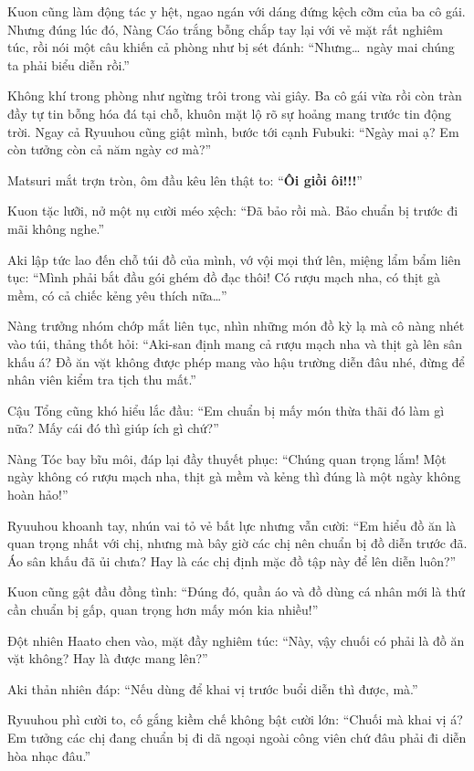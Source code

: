 \documentclass[../main.tex]{subfiles}
\begin{document}
Kuon cũng làm động tác y hệt, ngao ngán với dáng đứng kệch cỡm của ba cô gái. Nhưng đúng lúc đó, Nàng Cáo trắng bỗng chắp tay lại với vẻ mặt rất nghiêm túc, rồi nói một câu khiến cả phòng như bị sét đánh: ``Nhưng\dots\ ngày mai chúng ta phải biểu diễn rồi.''

Không khí trong phòng như ngừng trôi trong vài giây. Ba cô gái vừa rồi còn tràn đầy tự tin bỗng hóa đá tại chỗ, khuôn mặt lộ rõ sự hoảng mang trước tin động trời. Ngay cả Ryuuhou cũng giật mình, bước tới cạnh Fubuki: ``Ngày mai ạ? Em còn tưởng còn cả năm ngày cơ mà?''


Matsuri mắt trợn tròn, ôm đầu kêu lên thật to: ``\textbf{Ôi giồi ôi!!!}''

Kuon tặc lưỡi, nở một nụ cười méo xệch: ``Đã bảo rồi mà. Bảo chuẩn bị trước đi mãi không nghe.''

Aki lập tức lao đến chỗ túi đồ của mình, vớ vội mọi thứ lên, miệng lẩm bẩm liên tục: ``Mình phải bắt đầu gói ghém đồ đạc thôi! Có rượu mạch nha, có thịt gà mềm, có cả chiếc kẻng yêu thích nữa\dots''

Nàng trưởng nhóm chớp mắt liên tục, nhìn những món đồ kỳ lạ mà cô nàng nhét vào túi, thảng thốt hỏi: ``Aki-san định mang cả rượu mạch nha và thịt gà lên sân khấu á? Đồ ăn vặt không được phép mang vào hậu trường diễn đâu nhé, đừng để nhân viên kiểm tra tịch thu mất.''

Cậu Tổng cũng khó hiểu lắc đầu: ``Em chuẩn bị mấy món thừa thãi đó làm gì nữa? Mấy cái đó thì giúp ích gì chứ?''

Nàng Tóc bay bĩu môi, đáp lại đầy thuyết phục: ``Chúng quan trọng lắm! Một ngày không có rượu mạch nha, thịt gà mềm và kẻng thì đúng là một ngày không hoàn hảo!''

Ryuuhou khoanh tay, nhún vai tỏ vẻ bất lực nhưng vẫn cười: ``Em hiểu đồ ăn là quan trọng nhất với chị, nhưng mà bây giờ các chị nên chuẩn bị đồ diễn trước đã. Áo sân khấu đã ủi chưa? Hay là các chị định mặc đồ tập này để lên diễn luôn?''

Kuon cũng gật đầu đồng tình: ``Đúng đó, quần áo và đồ dùng cá nhân mới là thứ cần chuẩn bị gấp, quan trọng hơn mấy món kia nhiều!''

Đột nhiên Haato chen vào, mặt đầy nghiêm túc: ``Này, vậy chuối có phải là đồ ăn vặt không? Hay là được mang lên?''

Aki thản nhiên đáp: ``Nếu dùng để khai vị trước buổi diễn thì được, mà.''

Ryuuhou phì cười to, cố gắng kiềm chế không bật cười lớn: ``Chuối mà khai vị á? Em tưởng các chị đang chuẩn bị đi dã ngoại ngoài công viên chứ đâu phải đi diễn hòa nhạc đâu.''
\end{document}
